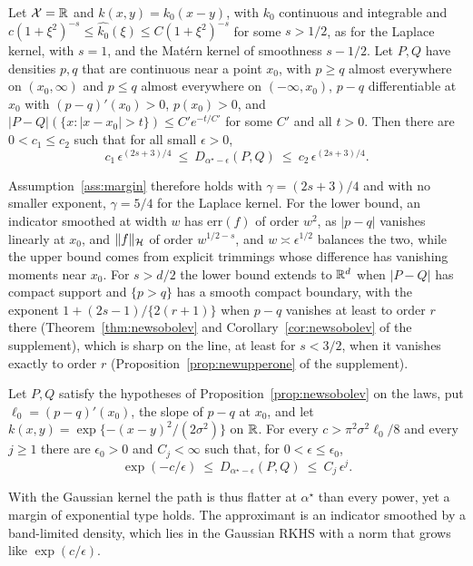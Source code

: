 \begin{proposition}
\label{prop:newsobolev}
Let $\mathcal X=\mathbb{R}$ and $k(x,y)=k_0(x-y)$, with $k_0$ continuous and integrable and
$c(1+\xi^2)^{-s}\le\widehat{k_0}(\xi)\le C(1+\xi^2)^{-s}$ for some $s>1/2$, as for the Laplace kernel, with
$s=1$, and the Mat\'ern kernel of smoothness $s-1/2$. Let $P,Q$ have densities $p,q$ that are continuous near a
point $x_0$, with $p\ge q$ almost everywhere on $(x_0,\infty)$ and $p\le q$ almost everywhere on $(-\infty,x_0)$, $p-q$
differentiable at $x_0$ with
$(p-q)'(x_0)>0$, $p(x_0)>0$, and $|P-Q|(\{x:|x-x_0|>t\})\le C'e^{-t/C'}$ for some $C'$ and all $t>0$. Then there are
$0<c_1\le c_2$ such that for all small $\epsilon>0$,
\[
c_1\,\epsilon^{(2s+3)/4}\ \le\ D_{\alpha^\star-\epsilon}(P,Q)\ \le\ c_2\,\epsilon^{(2s+3)/4} .
\]
\end{proposition}

Assumption~\ref{ass:margin} therefore holds with $\gamma=(2s+3)/4$ and with no smaller exponent, $\gamma=5/4$ for the
Laplace kernel. For the lower bound, an indicator smoothed at width $w$ has $\mathrm{err}(f)$ of order $w^2$, as
$|p-q|$ vanishes linearly at $x_0$, and $\|f\|_{\mathcal{H}}$ of order $w^{1/2-s}$, and $w\asymp\epsilon^{1/2}$ balances the two, while
the upper bound comes from explicit trimmings whose difference has vanishing moments near $x_0$. For $s>d/2$ the lower
bound extends to $\mathbb{R}^d$ when $|P-Q|$ has compact support and $\{p>q\}$ has a smooth compact boundary, with the exponent $1+(2s-1)/\{2(r+1)\}$ when
$p-q$ vanishes at least to order $r$ there (Theorem~\ref{thm:newsobolev} and Corollary~\ref{cor:newsobolev} of the
supplement), which is sharp on the line, at least for $s<3/2$, when it vanishes exactly to order $r$
(Proposition~\ref{prop:newupperone} of the supplement).

\begin{proposition}
\label{prop:newgauss}
Let $P,Q$ satisfy the hypotheses of Proposition~\ref{prop:newsobolev} on the laws, put $\ell_0=(p-q)'(x_0)$, the slope of $p-q$ at $x_0$, and let
$k(x,y)=\exp\{-(x-y)^2/(2\sigma^2)\}$ on $\mathbb{R}$. For every $c>\pi^2\sigma^2\ell_0/8$ and every $j\ge1$ there are
$\epsilon_0>0$ and $C_j<\infty$ such that, for $0<\epsilon\le\epsilon_0$,
\[
\exp(-c/\epsilon)\ \le\ D_{\alpha^\star-\epsilon}(P,Q)\ \le\ C_j\,\epsilon^j .
\]
\end{proposition}

With the Gaussian kernel the path is thus flatter at $\alpha^\star$ than every power, yet a margin of exponential type holds.
The approximant is an indicator smoothed by a band-limited density, which lies in the Gaussian RKHS
\citep{steinwart2006explicit} with a norm that grows like $\exp(c/\epsilon)$.

